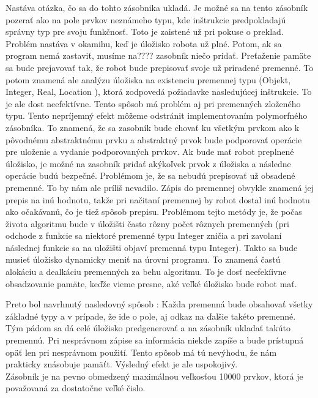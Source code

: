 Nastáva otázka, čo sa do tohto zásobnika ukladá. Je možné sa na tento zásobník pozerať ako na pole prvkov neznámeho typu, kde inštrukcie predpokladajú správny typ pre svoju funkčnosť. Toto je zaistené už pri pokuse o preklad. Problém nastáva v okamihu, keď je úložisko robota už plné. Potom, ak sa program nemá zastaviť, musíme na???? zasobník niečo pridať. Preťaženie pamäte sa bude prejavovať tak, že robot bude prepisovať svoje už priradené premenné. To potom znamená ale analýzu úložiska na existenciu premennej typu (Objekt, Integer, Real, Location ), ktorá zodpovedá požiadavke nasledujúcej inštrukcie. To je ale dost neefektívne. Tento spôsob má problém aj pri premenných zloženého typu. %
Tento nepríjemný efekt môžeme odstránit implementovaním polymorfného zásobníka. To znamená, že sa zasobník bude  chovať ku všetkým prvkom ako k pôvodnému abstraktnému prvku a abstraktný prvok bude podporovať operácie pre uloženie a vydanie podporovaných prvkov. Ak bude mať robot preplnené úložisko, je možné na zasobník pridať akýkoľvek prvok z úložiska a následne operácie budú bezpečné. Problémom je, že  sa nebudú prepisovať už obsadené premenné. To by nám ale príliš nevadilo. Zápis do premennej obvykle znamená jej prepis na inú hodnotu, takže pri načitaní premennej by robot dostal inú hodnotu ako očakávanú, čo je tiež spôsob prepisu. Problémom tejto metódy je, že počas života algoritmu bude v úložišti často rôzny počet rôznych premenných (pri odchode z funkcie sa niektoré premenné typu Integer zničia a pri zavolaní následnej funkcie sa na uložišti objaví premenná typu Integer). Takto sa bude musieť úložisko dynamicky meniť na úrovni programu. To znamená  častú alokáciu a dealkáciu premenných za behu algoritmu. To je dosť neefekíivne obsadzovanie pamäte, keďže vieme presne, aké veľké úložisko bude robot mať.
 
Preto bol navrhnutý nasledovný spôsob : Každa premenná bude obsahovať všetky základné typy a v prípade, že ide o pole, aj odkaz na ďalšie takéto premenné. Tým pádom sa dá celé úložisko predgenerovať a na zásobník ukladať takúto premennú. Pri nesprávnom zápise sa informácia niekde zapíše a bude prístupná opäť len pri nesprávnom použití. Tento spôsob má tú nevýhodu, že nám prakticky znásobuje pamäťt. Výsledný efekt je ale uspokojivý. \\

Zásobník je na pevno obmedzený maximálnou veľkosťou 10000 prvkov, ktorá je považovaná za dostatočne veľké čislo. \\

